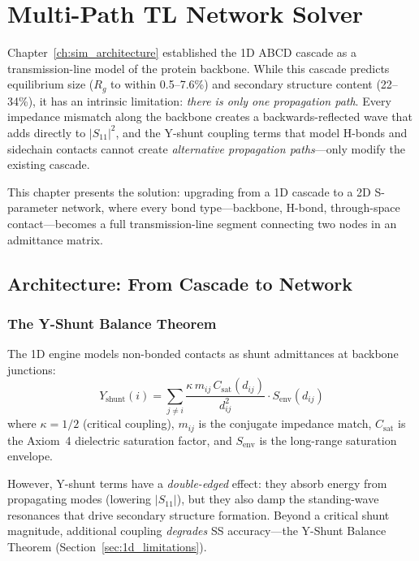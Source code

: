 \chapter{Multi-Path TL Network Solver}
\label{ch:network_solver}

Chapter~\ref{ch:sim_architecture} established the 1D ABCD cascade as a transmission-line model of the protein backbone.
While this cascade predicts equilibrium size ($R_g$ to within 0.5--7.6\%) and secondary structure content (22--34\%), it has an intrinsic limitation: \emph{there is only one propagation path}.
Every impedance mismatch along the backbone creates a backwards-reflected wave that adds directly to $|S_{11}|^2$, and the Y-shunt coupling terms that model H-bonds and sidechain contacts cannot create \emph{alternative propagation paths}---only modify the existing cascade.

This chapter presents the solution: upgrading from a 1D cascade to a 2D S-parameter network, where every bond type---backbone, H-bond, through-space contact---becomes a full transmission-line segment connecting two nodes in an admittance matrix.

\section{Architecture: From Cascade to Network}
\label{sec:cascade_to_network}

\subsection{The Y-Shunt Balance Theorem}
\label{sec:yshunt_balance}

The 1D engine models non-bonded contacts as shunt admittances at backbone junctions:
\begin{equation}
    Y_\text{shunt}(i) = \sum_{j \neq i} \frac{\kappa \, m_{ij} \, C_\text{sat}(d_{ij})}{d_{ij}^2} \cdot S_\text{env}(d_{ij})
    \label{eq:yshunt}
\end{equation}
where $\kappa = 1/2$ (critical coupling), $m_{ij}$ is the conjugate impedance match, $C_\text{sat}$ is the Axiom~4 dielectric saturation factor, and $S_\text{env}$ is the long-range saturation envelope.

However, Y-shunt terms have a \emph{double-edged} effect: they absorb energy from propagating modes (lowering $|S_{11}|$), but they also damp the standing-wave resonances that drive secondary structure formation.
Beyond a critical shunt magnitude, additional coupling \emph{degrades} SS accuracy---the Y-Shunt Balance Theorem (Section~\ref{sec:1d_limitations}).


